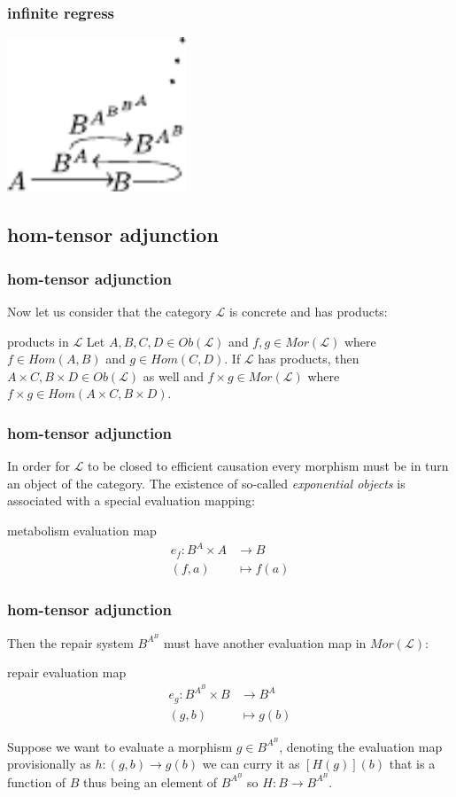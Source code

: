 \begin{frame}
\frametitle{infinite regress}
	\begin{center}
		\includegraphics[width=0.4\textwidth]{fig/mrcatinf.pdf}
	\end{center}
\end{frame}

\subsection{hom-tensor adjunction}
\begin{frame}
\frametitle{hom-tensor adjunction}
Now let us consider that the category $\mathcal{L}$ is concrete and has products:
\begin{block}{products in $\mathcal{L}$}
Let $A,B,C,D \in Ob(\mathcal{L})$ and $f,g \in Mor(\mathcal{L})$ where $f  \in Hom(A,B)$ and $g  \in Hom(C,D)$. If $\mathcal{L}$ has products, then $A \times C, B \times D \in Ob(\mathcal{L})$ as well and $f \times g \in Mor(\mathcal{L})$ where $f \times g \in Hom(A \times C ,B \times D)$.
\end{block}
\end{frame}

\begin{frame}
\frametitle{hom-tensor adjunction}
In order for  $\mathcal{L}$  to be closed to efficient causation every morphism must be in turn an object of the category. The existence of so-called {\it exponential objects} is associated with a special evaluation mapping:
\begin{block}{metabolism evaluation map}
\abovedisplayskip=0pt
\begin{align*}
e_f : B^A \times A &\longrightarrow B\\
(f,a) & \longmapsto f(a)
\end{align*}
\end{block}
\end{frame}

\begin{frame}
\frametitle{hom-tensor adjunction}
Then the repair system $B^{A^B}$ must have another evaluation map in $Mor(\mathcal{L})$:
\begin{block}{repair evaluation map}
\abovedisplayskip=0pt
\begin{align*}
	e_g: B^{A^B} \times B &\longrightarrow B^A\\
	                (g,b) & \longmapsto    g(b)
\end{align*}
\end{block}
Suppose we want to evaluate a morphism $g \in B^{A^B}$, denoting the evaluation map provisionally as $h: (g,b)\rightarrow g(b) $ we can curry it as $[H(g)](b)$ that is a function of $B$ thus being an element of $B^{A^B}$ so $H: B \rightarrow B^{A^B} $.
\end{frame}

